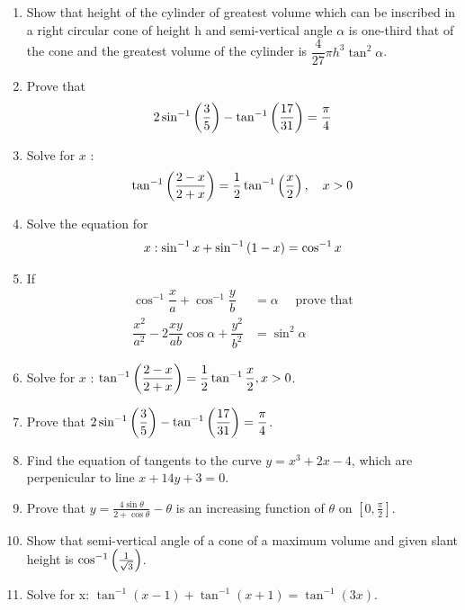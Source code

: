 \begin{enumerate}
    \item Show that height of the cylinder of greatest volume which can be inscribed in a right circular cone of height h and semi-vertical angle $\alpha$ is one-third that of the cone and the greatest volume of the cylinder is $\dfrac{4}{27} \pi h^3 \tan^2 \alpha$.
    \item Prove that
          \begin{align*}
              2\sin^{-1}\left(\dfrac{3}{5}\right)-\tan^{-1}\left(\dfrac{17}{31}\right)=\dfrac{\pi}{4}
          \end{align*}
    \item Solve for $x$ :
          \begin{align*}
              \tan^{-1}\left(\dfrac{2-x}{2+x}\right)=\dfrac{1}{2} \tan^{-1}\left(\dfrac{x}{2}\right),\quad x>0
          \end{align*}

    \item Solve the equation for
          \begin{align*}
              x: \sin^{-1} x + \sin^{-1}\left(1-x\right) = \cos^{-1}x
          \end{align*}
    \item If
          \begin{align*}
              \cos^{-1}\dfrac{x}{a} + \cos^{-1}\dfrac{y}{b}                   & = \alpha \quad \text{ prove that} \\
              \dfrac{x^2}{a^2} -2\dfrac{xy}{ab}\cos \alpha + \dfrac{y^2}{b^2} & = \sin^2 \alpha
          \end{align*}
    \item Solve for $x$ : $ \tan^{-1}\left(\dfrac{2-x}{2+x}\right) = \dfrac{1}{2}\tan^{-1}\dfrac{x}{2}, x>0$.
    \item Prove that $2\sin^{-1}\left(\dfrac{3}{5}\right) - \tan^{-1}\left(\dfrac{17}{31}\right) = \dfrac{\pi}{4}$.
    \item Find the equation of tangents to the curve $y=x^3+2x-4$, which are perpenicular to line $x+14y+3=0$.

    \item Prove that $y = \frac{4\sin\theta}{2+\cos\theta} - \theta$ is an increasing function of $\theta$ on $\left [0, \frac{\pi}{2}\right ]$.

    \item Show that semi-vertical angle of a cone of a maximum volume and given slant height is $\cos^{-1}\left(\frac{1}{\sqrt{3}}\right)$.

    \item Solve for x: $\tan^{-1}(x-1) + \tan^{-1}(x+1) = \tan^{-1}(3x)$.


\end{enumerate}
